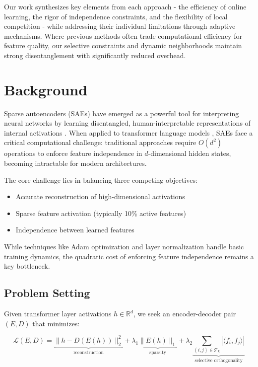\documentclass{article} %
\begin{document}
Our work synthesizes key elements from each approach - the efficiency of online learning, the rigor of independence constraints, and the flexibility of local competition - while addressing their individual limitations through adaptive mechanisms. Where previous methods often trade computational efficiency for feature quality, our selective constraints and dynamic neighborhoods maintain strong disentanglement with significantly reduced overhead.

\section{Background}
\label{sec:background}

Sparse autoencoders (SAEs) have emerged as a powerful tool for interpreting neural networks by learning disentangled, human-interpretable representations of internal activations \cite{goodfellow2016deep}. When applied to transformer language models \cite{vaswani2017attention}, SAEs face a critical computational challenge: traditional approaches require $O(d^2)$ operations to enforce feature independence in $d$-dimensional hidden states, becoming intractable for modern architectures.

The core challenge lies in balancing three competing objectives:
\begin{itemize}
    \item Accurate reconstruction of high-dimensional activations
    \item Sparse feature activation (typically 10\% active features)
    \item Independence between learned features
\end{itemize}

While techniques like Adam optimization \cite{kingma2014adam} and layer normalization \cite{ba2016layer} handle basic training dynamics, the quadratic cost of enforcing feature independence remains a key bottleneck.

\subsection{Problem Setting}
Given transformer layer activations $h \in \mathbb{R}^d$, we seek an encoder-decoder pair $(E,D)$ that minimizes:

\begin{equation}
    \mathcal{L}(E,D) = \underbrace{\|h - D(E(h))\|_2^2}_{\text{reconstruction}} + \lambda_1 \underbrace{\|E(h)\|_1}_{\text{sparsity}} + \lambda_2 \underbrace{\sum_{(i,j) \in \mathcal{T}_k} |\langle f_i, f_j \rangle|}_{\text{selective orthogonality}}
\end{equation}
\end{document}

